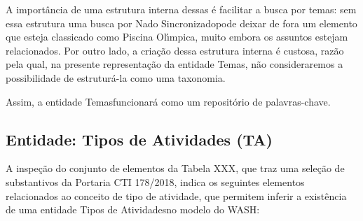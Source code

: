 \documentclass[
12pt,		%
openright,	%
twoside,  %
a4paper,			%
chapter=TITLE,		%
english,			%
french,				%
spanish,			%
brazil				%
]{USPSC-classe/USPSC}
\begin{document}
A import\^ancia de uma estrutura interna dessas \'e facilitar a busca por temas: sem essa estrutura uma busca por \textquotedbl Nado Sincronizado\textquotedbl  pode deixar de fora um elemento que esteja classicado como \textquotedbl Piscina Ol\'{\i}mpica\textquotedbl , muito embora os assuntos estejam relacionados. Por outro lado, a cria\c{c}\~ao dessa estrutura interna \'e custosa, raz\~ao pela qual, na presente representa\c{c}\~ao da entidade \textquotedbl Temas\textquotedbl , n\~ao consideraremos a possibilidade de estrutur\'a-la como uma taxonomia.










Assim, a entidade \textquotedbl Temas\textquotedbl  funcionar\'a como um reposit\'orio de palavras-chave.










\subsection[Entidade: Tipos de Atividades (TA)]{Entidade: Tipos de Atividades (TA)}\label{Entidade: Tipos de Atividades (TA)}
A inspe\c{c}\~ao do conjunto de elementos da Tabela XXX, que traz uma sele\c{c}\~ao de substantivos da Portaria CTI 178/2018, indica os seguintes elementos relacionados ao conceito de \textquotedbl tipo de atividade\textquotedbl , que permitem inferir a exist\^encia de uma entidade \textquotedbl Tipos de Atividades\textquotedbl  no modelo do WASH:











\noindent\begin{center}\mbox{\centering{}}\end{center}
\end{document}
